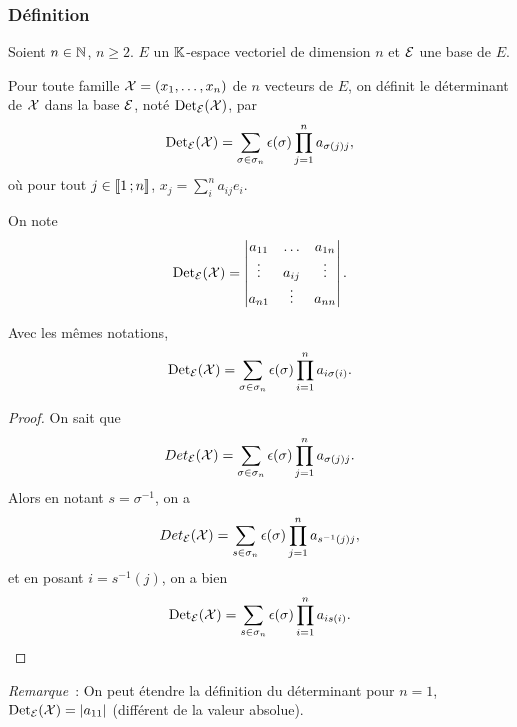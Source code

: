 \subsubsection{Définition}

Soient \(n \in \mathbb{N}\), \(n\geqslant 2\). \(E\) un \(\mathbb{K}\)-espace vectoriel de dimension \(n\) et \(\mathcal{E}\) une base de \(E\).
\begin{defdef}
  Pour toute famille \(\mathcal{X}=(x_1, \ldots, x_n)\) de \(n\) vecteurs de \(E\), on définit le déterminant de \(\mathcal{X}\) dans la base \(\mathcal{E}\), noté \(\operatorname{Det}_{\mathcal{E}}(\mathcal{X})\), par
  \begin{equation}
    \operatorname{Det}_{\mathcal{E}}(\mathcal{X}) = \sum_{\sigma \in \sigma_n}\epsilon(\sigma) \prod_{j=1}^n a_{\sigma(j)j},
  \end{equation}
  où pour tout \(j \in \mathopen{\llbracket}1\mathclose{}\mathpunct{};n\mathclose{\rrbracket}\), \(x_j=\sum_{i}^n a_{ij}e_i\).
\end{defdef}
On note 
\begin{equation}
  \operatorname{Det}_{\mathcal{E}}(\mathcal{X}) = \begin{vmatrix} a_{11} & \ldots & a_{1n} \\ \vdots & a_{ij} & \vdots \\ a_{n1} & \vdots & a_{nn}\end{vmatrix}.
\end{equation}
%
\begin{prop}
 Avec les mêmes notations,
 \begin{equation}
    \operatorname{Det}_{\mathcal{E}}(\mathcal{X}) = \sum_{\sigma \in \sigma_n}\epsilon(\sigma) \prod_{i=1}^n a_{i\sigma(i)}.
 \end{equation}
\end{prop}
\begin{proof}
  On sait que
  \begin{equation}
    Det_{\mathcal{E}}(\mathcal{X}) = \sum_{\sigma \in \sigma_n}\epsilon(\sigma) \prod_{j=1}^n a_{\sigma(j)j}.
  \end{equation}
  Alors en notant \(s=\sigma^{-1}\), on a
  \begin{equation}
    Det_{\mathcal{E}}(\mathcal{X}) = \sum_{s \in \sigma_n}\epsilon(\sigma) \prod_{j=1}^n a_{s^{-1}(j)j},
  \end{equation}
  et en posant \(i=s^{-1}(j)\), on a bien
   \begin{equation}
    \operatorname{Det}_{\mathcal{E}}(\mathcal{X}) = \sum_{s \in \sigma_n}\epsilon(\sigma) \prod_{i=1}^n a_{is(i)}.
  \end{equation}
\end{proof}

\emph{Remarque}~: On peut étendre la définition du déterminant pour \(n=1\), \(\operatorname{Det}_{\mathcal{E}}(\mathcal{X}) = \left\lvert a_{11}\right\rvert\) (\danger différent de la valeur absolue).

